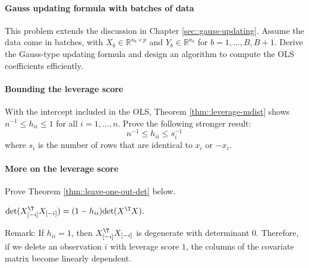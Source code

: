 \paragraph{Gauss updating formula with batches of data}
\label{hw10::gauss-updating-batch}

This problem extends the discussion in Chapter \ref{sec::gauss-updating}.
Assume the data come in batches, with $X_b \in \mathbb{R}^{n_b\times p}$ and $Y_b \in \mathbb{R}^{n_b}$ for $b=1,\ldots, B, B+1$. Derive the Gauss-type updating formula and design an algorithm to compute the OLS coefficients efficiently.





\paragraph{Bounding the leverage score}
\label{hw10::bounding-h-more}


With the intercept included in the OLS, Theorem \ref{thm::leverage-mdist} shows $ n^{-1} \leq h_{ii} \leq 1$ for all $i = 1, \ldots , n$.
Prove the following stronger result:
$$
n^{-1} \leq h_{ii} \leq   s_i^{-1}
$$
where $s_i$ is the number of rows that are identical to $x_i$ or $-x_i$.



 

\paragraph{More on the leverage score}
\label{hw10::h-grammatrix}
 
 
Prove Theorem \ref{thm::leave-one-out-det} below.   
 
\begin{theorem}
\label{thm::leave-one-out-det}
$\textup{det}(X_{[-i]}^{\T}X_{[-i]}) = (1-h_{ii}) \textup{det}(X^{\T} X). $
\end{theorem} 
 
 
 
 
Remark: If $h_{ii} =1$, then $X_{[-i]}^{\T}X_{[-i]}$ is degenerate with determinant $0$. Therefore, if we delete an observation $i$ with leverage score $1$, the columns of the covariate matrix become linearly dependent. 
